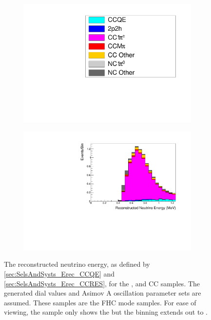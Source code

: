\begin{figure}[h]
\begin{subfigure}[t]{0.49\textwidth}
  \end{subfigure}
  \begin{subfigure}[t]{0.49\textwidth}
    \includegraphics[width=\textwidth, trim={0mm 0mm 0mm 0mm}, clip,page=1]{Figures/Selections/Legend.pdf}
    \subcaption{}
  \end{subfigure}%
  \begin{subfigure}[t]{0.49\textwidth}
    \includegraphics[width=\textwidth, trim={0mm 0mm 0mm 0mm}, clip,page=1]{Figures/Selections/FHCCC1pi-2020_X.pdf}
  \end{subfigure}
  \caption{The reconstructed neutrino energy, as defined by \autoref{sec:SelsAndSysts_Erec_CCQE} and \autoref{sec:SelsAndSysts_Erec_CCRES}, for the ,  and CC\quickmath{1\pi^{+}} samples. The generated dial values and Asimov A oscillation parameter sets are assumed. These samples are the FHC mode samples. For ease of viewing, the  sample only shows the  but the binning extends out to .}
  \label{fig:SelsAndSysts_Beam_ERecSpectra}
\end{figure}

